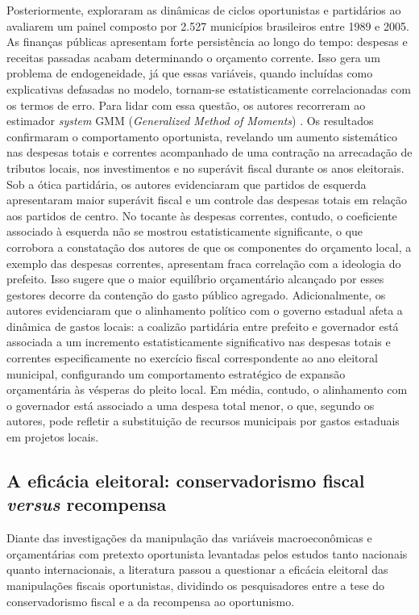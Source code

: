 Posteriormente, \textcite{sakurai2011} exploraram as dinâmicas de ciclos oportunistas e partidários ao avaliarem um painel composto por 2.527 municípios brasileiros entre 1989 e 2005. As finanças públicas apresentam forte persistência ao longo do tempo: despesas e receitas passadas acabam determinando o orçamento corrente. Isso gera um problema de endogeneidade, já que essas variáveis, quando incluídas como explicativas defasadas no modelo, tornam-se estatisticamente correlacionadas com os termos de erro. Para lidar com essa questão, os autores recorreram ao estimador \textit{system} GMM (\textit{Generalized Method of Moments}) \parencite{blundell1998}. Os resultados confirmaram o comportamento oportunista, revelando um aumento sistemático nas despesas totais e correntes acompanhado de uma contração na arrecadação de tributos locais, nos investimentos e no superávit fiscal durante os anos eleitorais. Sob a ótica partidária, os autores evidenciaram que partidos de esquerda apresentaram maior superávit fiscal e um controle das despesas totais em relação aos partidos de centro. No tocante às despesas correntes, contudo, o coeficiente associado à esquerda não se mostrou estatisticamente significante, o que corrobora a constatação dos autores de que os componentes do orçamento local, a exemplo das despesas correntes, apresentam fraca correlação com a ideologia do prefeito. Isso sugere que o maior equilíbrio orçamentário alcançado por esses gestores decorre da contenção do gasto público agregado. Adicionalmente, os autores evidenciaram que o alinhamento político com o governo estadual afeta a dinâmica de gastos locais: a coalizão partidária entre prefeito e governador está associada a um incremento estatisticamente significativo nas despesas totais e correntes especificamente no exercício fiscal correspondente ao ano eleitoral municipal, configurando um comportamento estratégico de expansão orçamentária às vésperas do pleito local. Em média, contudo, o alinhamento com o governador está associado a uma despesa total menor, o que, segundo os autores, pode refletir a substituição de recursos municipais por gastos estaduais em projetos locais.

\subsection{A eficácia eleitoral: conservadorismo fiscal \textit{versus} recompensa}

Diante das investigações da manipulação das variáveis macroeconômicas e orçamentárias com pretexto oportunista levantadas pelos estudos tanto nacionais quanto internacionais, a literatura passou a questionar a eficácia eleitoral das manipulações fiscais oportunistas, dividindo os pesquisadores entre a tese do conservadorismo fiscal e a da recompensa ao oportunismo.

